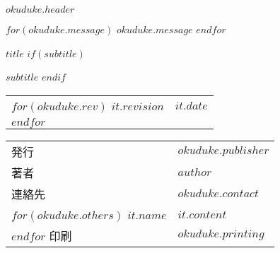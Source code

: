 \backmatter
$okuduke.header$

$for(okuduke.message)$
$okuduke.message$
$endfor$


\begin{center}
\textsf{$title$}
$if(subtitle)$

$subtitle$
$endif$

\begin{tabular}{ll}
$for(okuduke.rev)$
$it.revision$ & $it.date$ \\
$endfor$
\end{tabular}

\begin{tabular}{ll} \toprule
    発行      & $okuduke.publisher$ \\
    著者      & $author$ \\
    連絡先    & $okuduke.contact$ \\
    $for(okuduke.others)$
    $it.name$ & $it.content$ \\
    $endfor$
    印刷      & $okuduke.printing$  \\ \bottomrule
\end{tabular}
\end{center}
